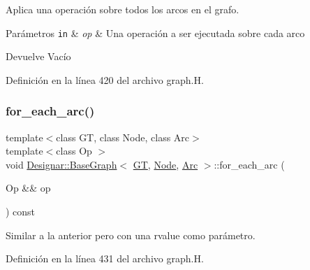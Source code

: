 Aplica una operación sobre todos los arcos en el grafo. 


\begin{DoxyParams}[1]{Parámetros}
\mbox{\tt in}  & {\em op} & Una operación a ser ejecutada sobre cada arco \\
\hline
\end{DoxyParams}
\begin{DoxyReturn}{Devuelve}
Vacío 
\end{DoxyReturn}


Definición en la línea 420 del archivo graph.\+H.

\mbox{\label{class_designar_1_1_base_graph_ae76905d5baebd62d0fc481efc7c20f66}} 
\subsubsection{\texorpdfstring{for\+\_\+each\+\_\+arc()}{for\_each\_arc()}\hspace{0.1cm}{\footnotesize\ttfamily [2/2]}}
{\footnotesize\ttfamily template$<$class GT, class Node, class Arc$>$ \\
template$<$class Op $>$ \\
void \hyperlink{class_designar_1_1_base_graph}{Designar\+::\+Base\+Graph}$<$ \hyperlink{demo-buildgraph_8_c_a3001c40d2c31ca87ed96cd7d1334a55e}{GT}, \hyperlink{namespace_designar_a5af326c65aa2bd26b26c410f2030d09e}{Node}, \hyperlink{namespace_designar_a3f55fb5513d62ff47cbc8f72b8e95d6f}{Arc} $>$\+::for\+\_\+each\+\_\+arc (\begin{DoxyParamCaption}\item[{Op \&\&}]{op }\end{DoxyParamCaption}) const\hspace{0.3cm}{\ttfamily [inline]}}



Similar a la anterior pero con una rvalue como parámetro. 



Definición en la línea 431 del archivo graph.\+H.

\mbox{\label{class_designar_1_1_base_graph_a9497531ac221edb5c5ef19888f78ad3c}} 
